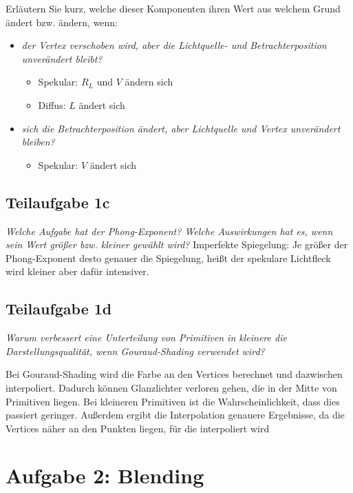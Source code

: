 \documentclass[a4paper]{scrartcl}
\begin{document}
Erläutern Sie kurz, welche dieser Komponenten ihren Wert aus welchem Grund ändert
bzw. ändern, wenn:

\begin{itemize}
    \item \textit{der Vertex verschoben wird, aber die Lichtquelle- und
          Betrachterposition unverändert bleibt?}
          \begin{itemize}
              \item Spekular: $R_L$ und $V$ ändern sich
              \item Diffus: $L$ ändert sich
          \end{itemize}
    \item \textit{sich die Betrachterposition ändert, aber Lichtquelle und Vertex unverändert bleiben?}
          \begin{itemize}
              \item Spekular: $V$ ändert sich
          \end{itemize}
\end{itemize}

\subsection*{Teilaufgabe 1c}
\textit{Welche Aufgabe hat der Phong-Exponent? Welche Auswirkungen hat es, wenn sein
Wert größer bzw. kleiner gewählt wird?}
Imperfekte Spiegelung: Je größer der Phong-Exponent desto genauer die Spiegelung, heißt der spekulare Lichtfleck wird kleiner aber dafür intensiver.

\subsection*{Teilaufgabe 1d}
\textit{Warum verbessert eine Unterteilung von Primitiven in kleinere die Darstellungsqualität, wenn Gouraud-Shading verwendet wird?}

Bei Gouraud-Shading wird die Farbe an den Vertices berechnet und dazwischen
interpoliert. Dadurch können Glanzlichter verloren gehen, die in der Mitte von
Primitiven liegen. Bei kleineren Primitiven ist die Wahrscheinlichkeit, dass
dies passiert geringer. Außerdem ergibt die Interpolation genauere Ergebnisse,
da die Vertices näher an den Punkten liegen, für die interpoliert wird

\section*{Aufgabe 2: Blending}
\end{document}

